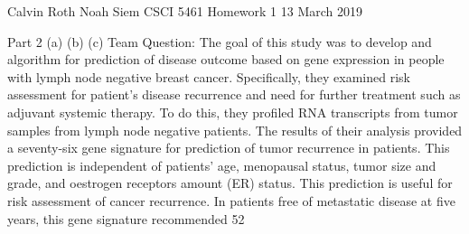 Calvin Roth
Noah Siem 
CSCI 5461 Homework 1
13 March 2019

Part 2
(a)
(b)
(c) 
Team Question: The goal of this study was to develop and algorithm for prediction of disease outcome based on gene expression in people with lymph node negative breast cancer. Specifically, they examined risk assessment for patient’s disease recurrence and need for further treatment such as adjuvant systemic therapy. To do this, they profiled RNA transcripts from tumor samples from lymph node negative patients. The results of their analysis provided a seventy-six gene signature for prediction of tumor recurrence in patients. This prediction is independent of patients’ age, menopausal status, tumor size and grade, and oestrogen receptors amount (ER) status. This prediction is useful for risk assessment of cancer recurrence. In patients free of metastatic disease at five years, this gene signature recommended 52%
